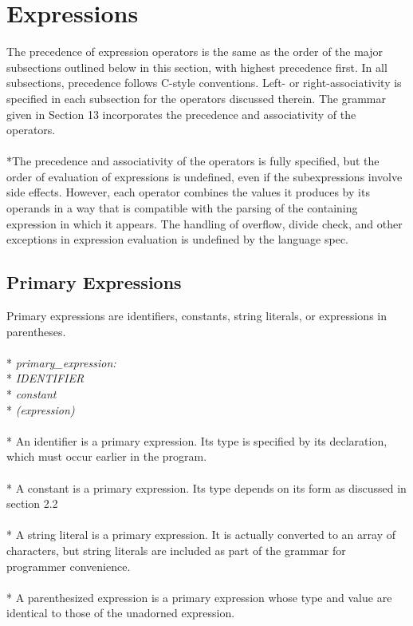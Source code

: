 \section{Expressions}
The precedence of expression operators is the same as the order of the major subsections outlined below in this section, with highest precedence first. In all subsections, precedence follows C-style conventions.  Left- or right-associativity is specified in each subsection for the operators discussed therein. The grammar given in Section 13 incorporates the precedence and associativity of the operators.
\\ \\*The precedence and associativity of the operators is fully specified, but the order of evaluation of expressions is undefined, even if the subexpressions involve side effects. However, each operator combines the values it produces by its operands in a way that is compatible with the parsing of the containing expression in which it appears. The handling of overflow, divide check, and other exceptions in expression evaluation is undefined by the language spec.
\subsection{Primary Expressions}
Primary expressions are identifiers, constants, string literals, or expressions in parentheses.
\\ \\* \tab \emph{primary\_expression:}
\\* \tab \tab \emph{IDENTIFIER}
\\* \tab \tab \emph{constant}
\\* \tab \tab \emph{(expression)}
\\ \\* An identifier is a primary expression. Its type is specified by its declaration, which must occur earlier in the program.
\\ \\* A constant is a primary expression. Its type depends on its form as discussed in section 2.2
\\ \\* A string literal is a primary expression. It is actually converted to an array of characters, but string literals are included as part of the grammar for programmer convenience.    
\\ \\* A parenthesized expression is a primary expression whose type and value are identical to those of the unadorned expression. 

